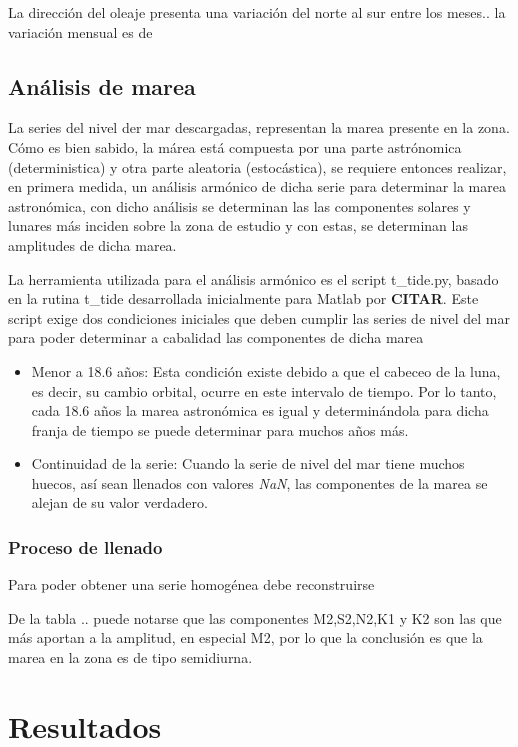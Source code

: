 \documentclass[5p,times,authoryear]{elsarticle}
\begin{document}
La dirección del oleaje presenta una variación del norte al sur entre los meses.. la variación mensual es de 

\subsection{Análisis de marea}
La series del nivel der mar descargadas, representan la marea presente en la zona. Cómo es bien sabido, la márea está compuesta por una parte astrónomica (deterministica) y otra parte aleatoria (estocástica), se requiere entonces realizar, en primera medida, un análisis armónico de dicha serie para determinar la marea astronómica, con dicho análisis se determinan las las componentes solares y lunares más inciden sobre la zona de estudio y con estas, se determinan las amplitudes de dicha marea.

La herramienta utilizada para el análisis armónico es el script t\_tide.py, basado en la rutina t\_tide desarrollada inicialmente para Matlab por \textbf{CITAR}. Este script exige dos condiciones iniciales que deben cumplir las series de nivel del mar para poder determinar a cabalidad las componentes de dicha marea

\begin{itemize}
    \item Menor a 18.6 años: Esta condición existe debido a que el cabeceo de la luna, es decir, su cambio orbital, ocurre en este intervalo de tiempo. Por lo tanto, cada 18.6 años la marea astronómica es igual y determinándola para dicha franja de tiempo se puede determinar para muchos años más.
    \item Continuidad de la serie: Cuando la serie de nivel del mar tiene muchos huecos, así sean llenados con valores \textit{NaN}, las componentes de la marea se alejan de su valor verdadero.
\end{itemize}

\subsubsection{Proceso de llenado}
Para poder obtener una serie homogénea debe reconstruirse 

De la tabla .. puede notarse que las componentes M2,S2,N2,K1 y K2 son las que más aportan a la amplitud, en especial M2, por lo que la conclusión es que la marea en la zona es de tipo semidiurna.


\section{Resultados}
\end{document}
